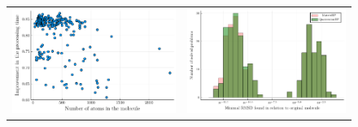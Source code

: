 \documentclass[a4paper,11pt]{article}
\begin{document}
\begin{figure}[H]
\begin{tabular}{cc}
			\includegraphics[scale=0.55]{figures/improvAll.pdf}& 
			\includegraphics[scale=0.55]{figures/histogramRMSD.pdf} \\
		\end{tabular}
		\label{fig:mean}
	\end{figure}
\end{document}
